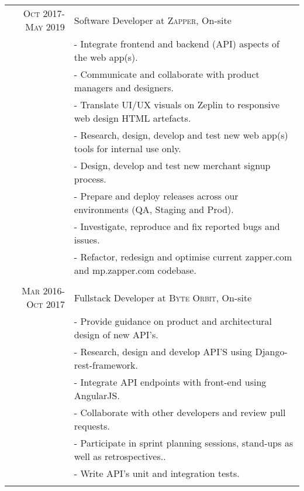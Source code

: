 \documentclass[a4paper,10pt]{article} %
\begin{document}
\begin{tabular}{r|p{11cm}}

\textsc{Oct 2017-May 2019} & Software Developer at \textsc{Zapper}, On-site \emph{}\\
& \footnotesize{- Integrate frontend and backend (API) aspects of the web app(s).}\\
& \footnotesize{- Communicate and collaborate with product managers and designers.}\\
& \footnotesize{- Translate UI/UX visuals on Zeplin to responsive web design HTML artefacts.}\\
& \footnotesize{- Research, design, develop and test new web app(s) tools for internal use only.}\\
& \footnotesize{- Design, develop and test new merchant signup process.}\\
& \footnotesize{- Prepare and deploy releases across our environments (QA, Staging and Prod).}\\
& \footnotesize{- Investigate, reproduce and fix reported bugs and issues.}\\
& \footnotesize{- Refactor, redesign and optimise current zapper.com and mp.zapper.com codebase.}\\
\multicolumn{2}{c}{} \\


\textsc{Mar 2016-Oct 2017} & Fullstack Developer at \textsc{Byte Orbit}, On-site \emph{}\\
& \footnotesize{- Provide guidance on product and architectural design of new API’s.}\\
& \footnotesize{- Research, design and develop API’S using Django-rest-framework.}\\
& \footnotesize{- Integrate API endpoints with front-end using AngularJS.}\\
& \footnotesize{- Collaborate with other developers and review pull requests.}\\
& \footnotesize{- Participate in sprint planning sessions, stand-ups as well as retrospectives..}\\
& \footnotesize{- Write API’s unit and integration tests.}\\
\multicolumn{2}{c}{} \\
\end{tabular}

\end{document}
